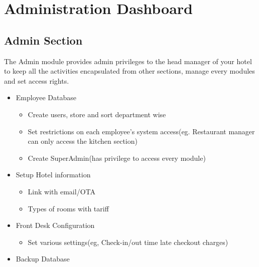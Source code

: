 \documentclass{scrreprt}
\begin{document}
\section{Administration Dashboard}


\subsection{Admin Section}
The Admin module provides admin privileges to the head manager of your hotel to keep all the activities encapsulated from other sections, manage every modules and set access rights.
\begin{itemize}
\item Employee Database
\begin{itemize}
\item Create users, store and sort department wise
\item Set restrictions on each employee’s system access(eg. Restaurant manager can only access the kitchen section)
\item Create SuperAdmin(has privilege to access every module)
\end{itemize}
\item Setup Hotel information
\begin{itemize}
\item Link with email/OTA
\item Types of rooms with tariff
\end{itemize}
\item Front Desk Configuration
\begin{itemize}
\item Set various settings(eg, Check-in/out time late checkout charges)
\end{itemize}
\item Backup Database
\end{itemize}
\end{document}
